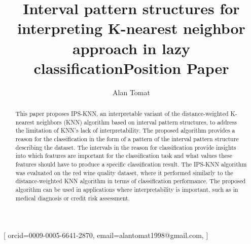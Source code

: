 \documentclass[
]{ceurart}
\begin{document}



\author[1]{Alan Tomat}[%
orcid=0009-0005-6641-2870,
email=alantomat1998@gmail.com,
]

\address[1]{Moscow Institute of Physics and Technology,
  Institutskiy per. 9, Dolgoprudny, Moscow Region 141700, Russia}
  

\title{Interval pattern structures for interpreting K-nearest neighbor approach in lazy classification}

\title[mode=sub]{Position Paper}







\begin{abstract}
This paper proposes IPS-KNN, an interpretable variant of the distance-weighted K-nearest neighbors (KNN) algorithm based on interval pattern structures, to address the limitation of KNN's lack of interpretability. The proposed algorithm provides a reason for the classification in the form of a pattern of the interval pattern structure describing the dataset. The intervals in the reason for classification provide insights into which features are important for the classification task and what values these features should have to produce a specific classification result. The IPS-KNN algorithm was evaluated on the red wine quality dataset, where it performed similarly to the distance-weighted KNN algorithm in terms of classification performance. The proposed algorithm can be used in applications where interpretability is important, such as in medical diagnosis or credit risk assessment.
\end{abstract}
\end{document}
